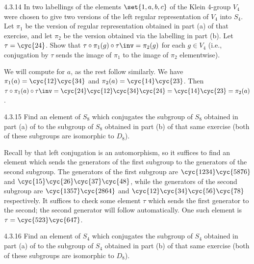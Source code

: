 \begin{exercise}{4.3.14}
	In  two labellings of the elements $\set{1, a, b, c}$ of the Klein 4-group $V_4$ were chosen to give two versions of the left regular representation of $V_4$ into $S_4$.
	Let $\pi_1$ be the version of regular representation obtained in part (a) of that exercise, and let $\pi_2$ be the version obtained via the labelling in part (b).
	Let $\tau = \cyc{2 4}$.
	Show that $\tau \circ \pi_1(g) \circ \tau\inv = \pi_2(g)$ for each $g \in V_4$ (i.e., conjugation by $\tau$ sends the image of $\pi_1$ to the image of $\pi_2$ elementwise).
\end{exercise}

\begin{sol}
	We will compute for $a$, as the rest follow similarly.
	We have $\pi_1(a) = \cyc{1 2}\cyc{3 4}$ and $\pi_2(a) = \cyc{1 4}\cyc{2 3}$.
	Then $\tau \circ \pi_1(a) \circ \tau\inv = \cyc{2 4}\cyc{1 2}\cyc{3 4}\cyc{2 4} = \cyc{1 4}\cyc{2 3} = \pi_2(a)$.
\end{sol}

\begin{exercise}{4.3.15}
	Find an element of $S_8$ which conjugates the subgroup of $S_8$ obtained in part (a) of  to the subgroup of $S_8$ obtained in part (b) of that same exercise (both of these subgroups are isomorphic to $D_8$).
\end{exercise}

\begin{sol}
	Recall by  that left conjugation is an automorphism, so it suffices to find an element which sends the generators of the first subgroup to the generators of the second subgroup.
	The generators of the first subgroup are $\cyc{1 2 3 4}\cyc{5 8 7 6}$ and $\cyc{1 5}\cyc{2 6}\cyc{3 7}\cyc{4 8}$, while the generators of the second subgroup are $\cyc{1 3 5 7}\cyc{2 8 6 4}$ and $\cyc{1 2}\cyc{3 4}\cyc{5 6}\cyc{7 8}$ respectively.
	It suffices to check some element $\tau$ which sends the first generator to the second; the second generator will follow automatically.
	One such element is $\tau = \cyc{5 2 3}\cyc{6 4 7}$.
\end{sol}

\begin{exercise}{4.3.16}
	Find an element of $S_4$ which conjugates the subgroup of $S_4$ obtained in part (a) of  to the subgroup of $S_4$ obtained in part (b) of that same exercise (both of these subgroups are isomorphic to $D_8$).
\end{exercise}

